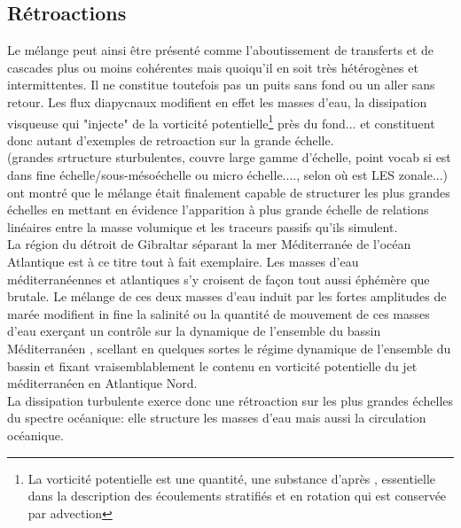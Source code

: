 \subsection{Rétroactions}
\label{subsection_retroactions}
Le mélange peut ainsi être présenté comme l'aboutissement de transferts et de cascades plus ou moins cohérentes mais quoiqu'il en soit très hétérogènes et intermittentes. Il ne constitue toutefois pas un puits sans fond ou un aller sans retour. Les flux diapycnaux modifient en effet les masses d'eau, la dissipation visqueuse qui "injecte" de la vorticité potentielle\footnote{La vorticité potentielle est une quantité, une substance d'après \cite{haynes_conservation_1990}, essentielle dans la description des écoulements stratifiés et en rotation qui est conservée par advection} près du fond... et constituent donc autant d'exemples de retroaction sur la grande échelle.\\
\color{red}(grandes srtructure sturbulentes, couvre large gamme d'échelle, point vocab si est dans fine échelle/sous-mésoéchelle ou micro échelle...., selon où est LES zonale...)\color{blue}\\
\cite{penney_2020} ont montré que le mélange était finalement capable de structurer les plus grandes échelles en mettant en évidence l'apparition à plus grande échelle de relations linéaires entre la masse volumique et les traceurs passifs qu'ils simulent.\\
La région du détroit de Gibraltar séparant la mer Méditerranée de l'océan Atlantique est à ce titre tout à fait exemplaire. Les masses d'eau méditerranéennes et atlantiques s'y croisent de façon tout aussi éphémère que brutale. Le mélange de ces deux masses d'eau induit par les fortes amplitudes de marée modifient in fine la salinité ou la quantité de mouvement de ces masses d'eau exerçant un contrôle sur la dynamique de l'ensemble du bassin Méditerranéen \citep{armi_1988}, scellant en quelques sortes le régime dynamique de l'ensemble du bassin et fixant vraisemblablement le contenu en vorticité potentielle du jet méditerranéen en Atlantique Nord.\\
La dissipation turbulente exerce donc une rétroaction sur les plus grandes échelles du spectre océanique: elle  structure les masses d'eau mais aussi la circulation océanique.
\color{black}

